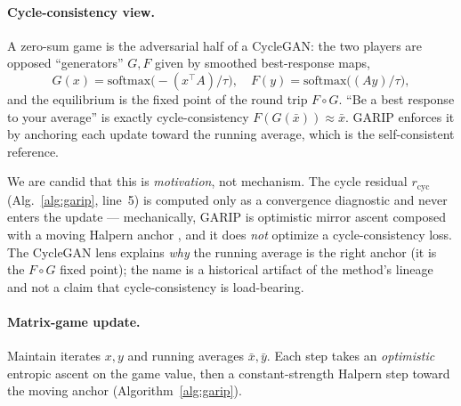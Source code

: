 \documentclass[10pt,twocolumn]{article}
\theoremstyle{plain}
\theoremstyle{remark}
\newcommand{\xbar}{\bar{x}}
\newcommand{\ybar}{\bar{y}}
\newcommand{\softmax}{\mathrm{softmax}}
\begin{document}
\paragraph{Cycle-consistency view.} A zero-sum game is the adversarial half of
a CycleGAN: the two players are opposed ``generators'' $G,F$ given by smoothed
best-response maps,
\[
G(x)=\softmax\!\big(\!-(x^\top A)/\tau\big),\quad
F(y)=\softmax\!\big((Ay)/\tau\big),
\]
and the equilibrium is the fixed point of the round trip $F\!\circ\!G$.
``Be a best response to your average'' is exactly cycle-consistency
$F(G(\bar{x}))\approx\bar{x}$. GARIP enforces it by anchoring each update toward
the running average, which is the self-consistent reference.

We are candid that this is \emph{motivation}, not mechanism. The cycle residual
$r_{\text{cyc}}$ (Alg.~\ref{alg:garip}, line~5) is computed only as a convergence
diagnostic and never enters the update --- mechanically, GARIP is optimistic
mirror ascent \cite{daskalakis2018optimistic} composed with a moving Halpern
anchor \cite{halpern1967,yoon2021accelerated}, and it does \emph{not} optimize a
cycle-consistency loss. The CycleGAN lens explains \emph{why} the running average
is the right anchor (it is the $F\!\circ\!G$ fixed point); the name is a
historical artifact of the method's lineage and not a claim that cycle-consistency
is load-bearing.

\paragraph{Matrix-game update.} Maintain iterates $x,y$ and running averages
$\xbar,\ybar$. Each step takes an \emph{optimistic} entropic ascent on the game
value, then a constant-strength Halpern step toward the moving anchor
(Algorithm~\ref{alg:garip}).
\end{document}

